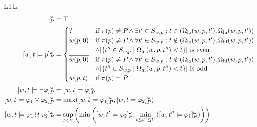 \documentclass[envcountsame, runningheads]{llncs}
\def\until{\,\mathcal{U}\,}
\def\since{\,\mathcal{S}\,}
\newcommand{\?}{\text{?}}
\newcommand{\suchthat}{\;\ifnum\currentgrouptype=16 \middle\fi|\;}
\let\st\suchthat
\begin{document}
	LTL:
	\begin{align*}
		[w,t \models \texttt{true}]_P^\omega &= \top \\
		[w,t \models p]_P^\omega &= \begin{cases}
			? &\text{if } \pi(p) \not = P \land \exists t' \in S_{w,p} : t \in (\Omega_{\text{lo}}(w, p, t'), \Omega_{\text{hi}}(w, p, t')) \\
			w(p,0) &\text{if } \pi(p) \not = P \land \forall t' \in S_{w,p} : t \notin (\Omega_{\text{lo}}(w, p, t'), \Omega_{\text{hi}}(w, p, t')) \\
			&\land |\{t'' \in S_{w,p} \st \Omega_{\text{hi}}(w, p, t'') < t\}| \text{ is even} \\
			\overline{w(p,0)} &\text{if } \pi(p) \not = P \land \forall t' \in S_{w,p} : t \notin (\Omega_{\text{lo}}(w, p, t'), \Omega_{\text{hi}}(w, p, t')) \\
			&\land |\{t'' \in S_{w,p} \st \Omega_{\text{hi}}(w, p, t'') < t\}| \text{ is odd} \\
			w(p,t) &\text{if } \pi(p) = P \\
		\end{cases} \\
		[w,t \models \lnot \varphi]_P^\omega &= \overline{[w,t \models \varphi]_P^\omega}\\
		[w,t \models \varphi_1 \lor \varphi_2]_P^\omega &= \max([w,t \models \varphi_1]_P^\omega, [w,t \models \varphi_2]_P^\omega)\\
		[w,t \models \varphi_1 \until \varphi_2]_P^\omega &= \sup_{t \leq t'} \left( \min \left( [w,t' \models \varphi_2]_P^\omega, \min_{t \leq t'' \leq t'} \left( [w,t'' \models \varphi_1]_P^\omega \right) \right) \right)\\
	\end{align*}
	
\end{document}
